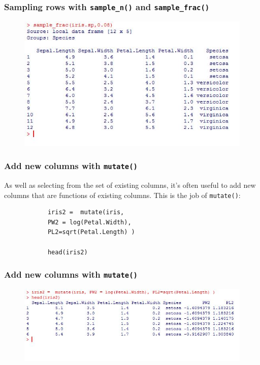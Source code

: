 \documentclass{beamer}
\begin{document}
	\begin{frame}
		\frametitle{Sampling rows with \texttt{sample\_n()} and \texttt{sample\_frac()}}
		
		\begin{figure}
			\centering
			\includegraphics[width=1.07\linewidth]{images/irissample3}
		\end{figure}
		
	\end{frame}
	\begin{frame}[fragile]
		\frametitle{Add new columns with \texttt{mutate()} }
		
		As well as selecting from the set of existing columns, it’s often useful to add new columns that are functions of existing columns. This is the job of \texttt{mutate()}:
		
		\begin{framed}
			\begin{verbatim}
			iris2 =  mutate(iris, 
			PW2 = log(Petal.Width), 
			PL2=sqrt(Petal.Length) )
			
			head(iris2)
			\end{verbatim}
		\end{framed}
	\end{frame}
	\begin{frame}
		
		\frametitle{Add new columns with \texttt{mutate()} }
		\begin{figure}
			\centering
			\includegraphics[width=0.9\linewidth]{images/irismutate}
			
		\end{figure}
		
	\end{frame}
\end{document}
